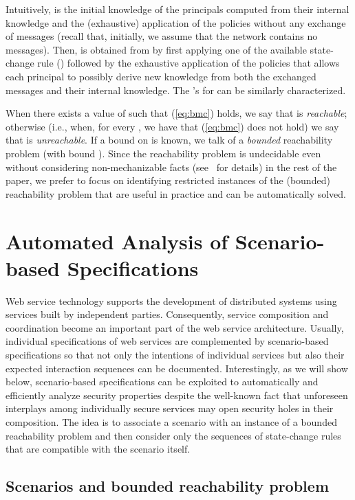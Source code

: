 \documentclass[conference]{llncs}
\begin{document}
Intuitively,  is the initial knowledge of the
principals computed from their internal knowledge and the (exhaustive)
application of the policies without any exchange of messages (recall
that, initially, we assume that the network contains no messages).
Then,  is obtained from  by first
applying one of the available state-change rule ()
followed by the exhaustive application of the policies that allows
each principal to possibly derive new knowledge from both the
exchanged messages and their internal knowledge.  The
's for  can be similarly characterized.

When there exists a value of  such that
(\ref{eq:bmc}) holds, we say that  is \emph{reachable}; otherwise
(i.e., when, for every , we have that (\ref{eq:bmc}) does not
hold) we say that  is \emph{unreachable}.  If a bound  on  is
known, we talk of a \emph{bounded} reachability  problem (with
bound ). 
Since the reachability problem is undecidable even without
considering non-mechanizable facts (see~\cite{BRV-TR12} for
details) in the rest of the paper, we prefer to focus on identifying restricted
instances of the (bounded) reachability problem that are useful in
practice and can be automatically solved.

\section{Automated Analysis of Scenario-based Specifications} 
\label{sec:symb-exec}
Web service technology supports the development of distributed systems
using services built by independent parties.  Consequently, service
composition and coordination become an important part of the web
service architecture.  Usually, individual specifications of web
services are complemented by scenario-based specifications so that not
only the intentions of individual services but also their expected
interaction sequences can be documented.  Interestingly, as we will
show below, scenario-based specifications can be exploited to
automatically and efficiently analyze security properties despite the
well-known fact that unforeseen interplays among individually secure
services may open security holes in their composition.  The idea is to
associate a scenario with an instance of a bounded reachability
problem and then consider only the sequences of state-change rules
that are compatible with the scenario itself.

\subsection{Scenarios and bounded reachability problem}  
\end{document}
